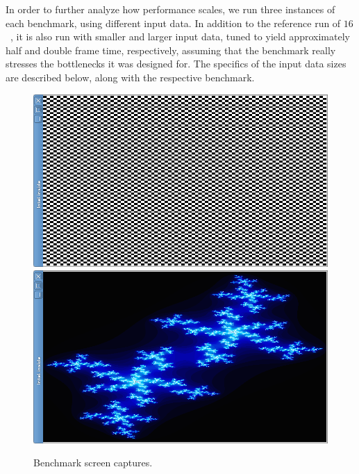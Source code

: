 In order to further analyze how performance scales, we run three
instances of each benchmark, using different input data. In addition
to the reference run of $16$~\milli\second , it is also run with
smaller and larger input data, tuned to yield approximately half and
double frame time, respectively, assuming that the benchmark really
stresses the bottlenecks it was designed for.  The specifics of the
input data sizes are described below, along with the respective
benchmark.

\begin{figure}
  \minipage{\linewidth}
  \includegraphics[width=\linewidth]{img/imgchess.png}
  \endminipage\\[6pt]
  \minipage{\linewidth}
  \includegraphics[width=\linewidth]{img/imgjulia.png}
  \caption[Benchmark screen captures]{Benchmark screen captures.}
  \label{fig:benchmarks}
  \endminipage
\end{figure}

